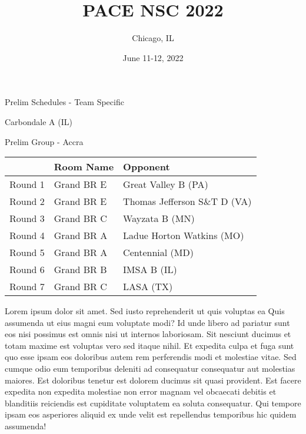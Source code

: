 \documentclass{article}%
\title{PACE NSC 2022}%
\author{Chicago, IL}%
\date{June 11{-}12, 2022}%
\begin{document}
%
\normalsize%
%
\maketitle%
\vspace*{48pt}%
\begin{center}%
\begin{Huge}%
Prelim Schedules {-} Team Specific%
\end{Huge}%
\end{center}%
\newpage%
%
\begin{center}%
\begin{Huge}%
Carbondale A (IL)%
\end{Huge}%
\vspace*{8pt}%
\linebreak%
\begin{Large}%
Prelim Group {-} Accra%
\end{Large}%
\end{center}%
\begin{tabularx}{\textwidth}{|c|Y|Y|}%
\hline%
&Room Name&Opponent\\%
\hline%
Round 1&Grand BR E&Great Valley B (PA)\\%
Round 2&Grand BR E&Thomas Jefferson S\&T D (VA)\\%
Round 3&Grand BR C&Wayzata B (MN)\\%
Round 4&Grand BR A&Ladue Horton Watkins (MO)\\%
Round 5&Grand BR A&Centennial (MD)\\%
Round 6&Grand BR B&IMSA B (IL)\\%
Round 7&Grand BR C&LASA (TX)\\%
\hline%
\end{tabularx}%
\vspace*{8pt}%
\linebreak%
\newline%
\newline%
Lorem ipsum dolor sit amet. Sed iusto reprehenderit ut quis voluptas ea Quis assumenda ut eius magni eum voluptate modi? Id unde libero ad pariatur sunt eos nisi possimus est omnis nisi ut internos laboriosam. Sit nesciunt ducimus et totam maxime est voluptas vero sed itaque nihil. Et expedita culpa et fuga sunt quo esse ipsam eos doloribus autem rem perferendis modi et molestiae vitae.\newline%
\newline%
Sed cumque odio eum temporibus deleniti ad consequatur consequatur aut molestias maiores. Est doloribus tenetur est dolorem ducimus sit quasi provident. Est facere expedita non expedita molestiae non error magnam vel obcaecati debitis et blanditiis reiciendis est cupiditate voluptatem ea soluta consequatur. Qui tempore ipsam eos asperiores aliquid ex unde velit est repellendus temporibus hic quidem assumenda!\newline%
\end{document}
